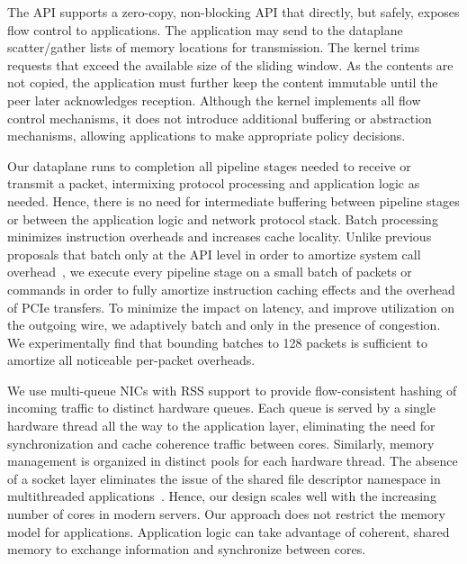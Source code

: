  The API supports a zero-copy,
non-blocking API that directly, but safely, exposes flow control to
applications. The application may send to the dataplane scatter/gather
lists of memory locations for transmission.  The kernel trims requests
that exceed the available size of the sliding window. As the contents
are not copied, the application must further keep the content
immutable until the peer later acknowledges reception.  Although
the kernel implements all flow control mechanisms, it does not
introduce additional buffering or abstraction mechanisms, allowing
applications to make appropriate policy decisions.


 Our dataplane
runs to completion all pipeline stages needed to receive or transmit a
packet, intermixing protocol processing and application logic as
needed. Hence, there is no need for intermediate buffering between
pipeline stages or between the application logic and network protocol
stack. Batch processing minimizes instruction overheads and increases
cache locality.  Unlike previous proposals that batch only at the API
level in order to amortize system call
overhead~\cite{jeong2014mtcp,han2012megapipe}, we execute every
pipeline stage on a small batch of packets or commands in order to
fully amortize instruction caching effects and the overhead of PCIe
transfers.  To minimize the impact on latency, and improve utilization
on the outgoing wire, we adaptively batch and only in the presence of
congestion. We experimentally find that bounding batches to 128
packets is sufficient to amortize all noticeable per-packet overheads.




 We use multi-queue
NICs with RSS support to provide flow-consistent hashing of incoming
traffic to distinct hardware queues. Each queue is served by a single
hardware thread all the way to the application layer, eliminating the
need for synchronization and cache coherence traffic between
cores. Similarly, memory management is organized in distinct pools for
each hardware thread. The absence of a socket layer eliminates the
issue of the shared file descriptor namespace in multithreaded applications~\cite{DBLP:conf/sosp/ClementsKZMK13}. Hence,
our design scales well with the increasing number of cores in modern
servers. Our approach does not restrict the memory model for
applications. Application logic can take advantage of coherent, shared
memory to exchange information and synchronize between cores. 



